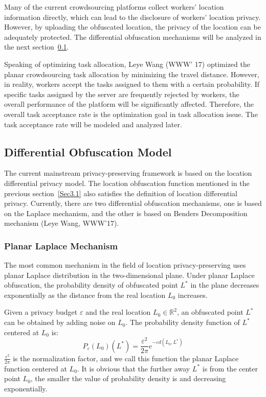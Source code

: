Many of the current crowdsourcing platforms collect workers' location information directly, which can lead to the disclosure of workers' location privacy. However, by uploading the obfuscated location, the privacy of the location can be adequately protected. The differential obfuscation mechanisms will be analyzed in the next section~\ref{Sec3.2}.

Speaking of optimizing task allocation, Leye Wang (WWW' 17) optimized the planar crowdsourcing task allocation by minimizing the travel distance. However, in reality, workers accept the tasks assigned to them with a certain probability. If specific tasks assigned by the server are frequently rejected by workers, the overall performance of the platform will be significantly affected. Therefore, the overall task acceptance rate is the optimization goal in task allocation issue. The task acceptance rate will be modeled and analyzed later.

\subsection{Differential Obfuscation Model} %
\label{Sec3.2}
The current mainstream privacy-preserving framework is based on the location differential privacy model. The location obfuscation function mentioned in the previous section~\ref{Sec3.1} also satisfies the definition of location differential privacy. Currently, there are two differential obfuscation mechanisms, one is based on the Laplace mechanism, and the other is based on Benders Decomposition mechanism (Leye Wang, WWW'17).

\subsubsection{Planar Laplace Mechanism}
The most common mechanism in the field of location privacy-preserving uses planar Laplace distribution in the two-dimensional plane. Under planar Laplace obfuscation, the probability density of obfuscated point $L^*$ in the plane decreases exponentially as the distance from the real location $L_0$ increases. 

Given a privacy budget $\varepsilon$ and the real location $L_0 \in \mathbb R^2$, an obfuscated point $L^*$ can be obtained by adding noise on $L_0$. The probability density function of $L^*$ centered at $L_0$ is:
$$
	P_\varepsilon (L_0)(L^*)=\frac{\varepsilon^2}{2\pi} e^{-\varepsilon d(L_0,L^*)}
$$
$\frac{\varepsilon^2}{2\pi}$ is the normalization factor, and we call this function the planar Laplace function centered at $L_0$. It is obvious that the further away $L^*$ is from the center point $L_0$, the smaller the value of probability density is and decreasing exponentially.


